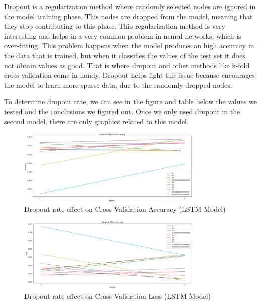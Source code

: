\documentclass[conference]{IEEEtran}
\begin{document}
Dropout is a regularization method where randomly selected nodes are ignored in the model training phase. This nodes are dropped from the model, meaning that they stop contributing to this phase. This regularization method is very interesting and helps in a very common problem in neural networks, which is over-fitting. This problem happens when the model produces an high accuracy in the data that is trained, but when it classifies the values of the test set it does not obtain values as good. That is where dropout and other methods like k-fold cross validation come in handy. Dropout helps fight this issue because encourages the model to learn more sparse data, due to the randomly dropped nodes.

To determine dropout rate, we can see in the figure and table below the values we tested and the conclusions we figured out. Once we only used dropout in the second model, there are only graphics related to this model.

\begin{figure}[H]
    \centering
    \includegraphics[width=3.5in]{pictures/model1_dropout_accuracy.png}
    \caption{Dropout rate effect on Cross Validation Accuracy (LSTM Model)}\label{fig:dropout_acc}
\end{figure}

\begin{figure}[H]
    \centering
    \includegraphics[width=3.5in]{pictures/model1_dropout_loss.png}
    \caption{Dropout rate effect on Cross Validation Loss (LSTM Model)}\label{fig:dropout_loss}
\end{figure}
\end{document}
